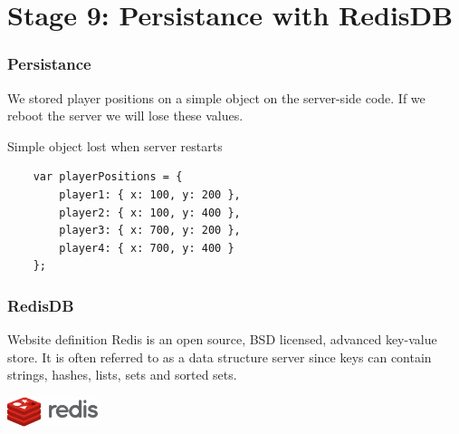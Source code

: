 \section{Stage 9: Persistance with RedisDB}

\begin{frame}[fragile]
  \frametitle{Persistance}

  We stored player positions on a simple object on the server-side code. If we reboot the server we will lose these values.

  \begin{block}{Simple object lost when server restarts}
    {\scriptsize
    \begin{verbatim}
    var playerPositions = {
        player1: { x: 100, y: 200 },
        player2: { x: 100, y: 400 },
        player3: { x: 700, y: 200 },
        player4: { x: 700, y: 400 }
    };
    \end{verbatim}
    }
  \end{block}
\end{frame}

\begin{frame}[fragile]
  \frametitle{RedisDB}
  \begin{block}{Website definition}
    Redis is an open source, BSD licensed, advanced key-value store. It is often referred to as a data structure server since keys can contain strings, hashes, lists, sets and sorted sets.
  \end{block}

  \begin{center}
    \includegraphics[width=100px]{images/redis-logo.jpg}
  \end{center}
\end{frame}

